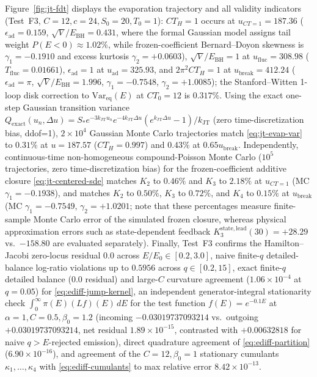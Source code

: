\documentclass[11pt,a4paper]{article}
\theoremstyle{definition}
\theoremstyle{remark}
\newcommand{\1}{\mathbf{1}}
\newcommand{\code}[1]{{\scriptsize\ttfamily #1}}
\begin{document}
Figure~\ref{fig:jt-fdt} displays the evaporation trajectory and all validity indicators (Test~F3, $C=12, c=24, S_0=20, T_0=1$): $CT_H = 1$ occurs at $u_{CT=1}=187.36$ ($\epsilon_{\mathrm{ad}}=0.159$, $\sqrt{V}/E_{\mathrm{BH}}=0.431$, where the formal Gaussian model assigns tail weight $P(E<0)\approx 1.02\%$, while frozen-coefficient Bernard--Doyon skewness is $\gamma_1=-0.1910$ and excess kurtosis $\gamma_2=+0.0603$), $\sqrt{V}/E_{\mathrm{BH}}=1$ at $u_{\mathrm{fluc}}=308.98$ ($T_{\mathrm{fluc}}=0.01661$), $\epsilon_{\mathrm{ad}}=1$ at $u_{\mathrm{ad}}=325.93$, and $2\pi^2 CT_H=1$ at $u_{\mathrm{break}}=412.24$ ($\epsilon_{\mathrm{ad}}=\pi$, $\sqrt{V}/E_{\mathrm{BH}}=1.996$, $\gamma_1=-0.7548$, $\gamma_2=+1.0085$); the Stanford--Witten 1-loop disk correction to $\mathrm{Var}_{\mathrm{eq}}(E)$ at $CT_0=12$ is $0.317\%$. Using the exact one-step Gaussian transition variance $Q_{\mathrm{exact}}(u_n,\Delta u) = S_* e^{-3k_{\mathrm{JT}}u_n} e^{-4k_{\mathrm{JT}}\Delta u}(e^{k_{\mathrm{JT}}\Delta u}-1)/k_{\mathrm{JT}}$ (zero time-discretization bias, \code{ddof=1}), $2\times 10^4$ Gaussian Monte Carlo trajectories match \eqref{eq:jt-evap-var} to $0.31\%$ at $u=187.57$ ($CT_H=0.997$) and $0.43\%$ at $0.65 u_{\mathrm{break}}$. Independently, continuous-time non-homogeneous compound-Poisson Monte Carlo ($10^5$ trajectories, zero time-discretization bias) for the frozen-coefficient additive closure \eqref{eq:jt-centered-sde} matches $K_2$ to $0.46\%$ and $K_3$ to $2.18\%$ at $u_{CT=1}$ (MC $\gamma_1=-0.1938$), and matches $K_2$ to $0.50\%$, $K_3$ to $0.72\%$, and $K_4$ to $0.15\%$ at $u_{\mathrm{break}}$ (MC $\gamma_1=-0.7549$, $\gamma_2=+1.0201$; note that these percentages measure finite-sample Monte Carlo error of the simulated frozen closure, whereas physical approximation errors such as state-dependent feedback $K_3^{\mathrm{state,lead}}(30)=+28.29$ vs.\ $-158.80$ are evaluated separately). Finally, Test~F3 confirms the Hamilton--Jacobi zero-locus residual $0.0$ across $E/E_0\in[0.2,3.0]$, naive finite-$q$ detailed-balance log-ratio violations up to $0.5956$ across $q\in[0.2,15]$, exact finite-$q$ detailed balance ($0.0$ residual) and large-$C$ curvature agreement ($1.06\times 10^{-4}$ at $q=0.05$) for \eqref{eq:ediff-jump-kernel}, an independent generator-integral stationarity check $\int_0^\infty\pi(E)(Lf)(E)\,dE$ for the test function $f(E)=e^{-0.1E}$ at $\alpha=1, C=0.5, \beta_0=1.2$ (incoming $-0.03019737093214$ vs.\ outgoing $+0.03019737093214$, net residual $1.89\times 10^{-15}$, contrasted with $+0.00632818$ for naive $q>E$-rejected emission), direct quadrature agreement of \eqref{eq:ediff-partition} ($6.90\times 10^{-16}$), and agreement of the $C=12, \beta_0=1$ stationary cumulants $\kappa_1,\dots,\kappa_4$ with \eqref{eq:ediff-cumulants} to max relative error $8.42\times 10^{-13}$.
\end{document}

